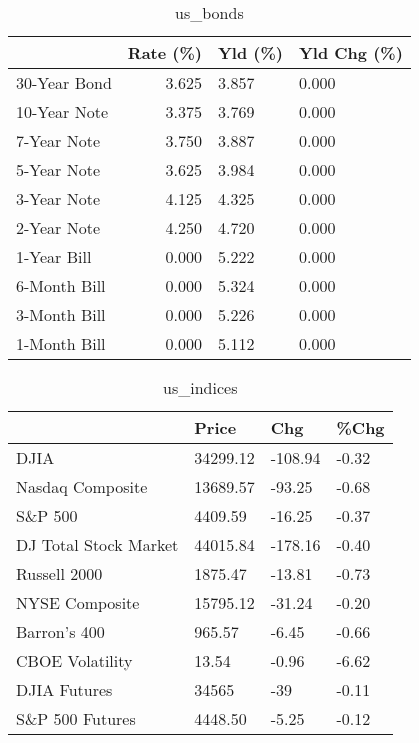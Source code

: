 \documentclass{article}%
\begin{document}
%


\begin{table}[htbp]%
\caption{us\_bonds}%
\centering%
\begin{adjustbox}{width=1\textwidth}%
\begin{tabular}{lrll}
\toprule
             &  Rate (\%) & Yld (\%) & Yld Chg (\%) \\
\midrule
30-Year Bond &     3.625 &   3.857 &       0.000 \\
10-Year Note &     3.375 &   3.769 &       0.000 \\
 7-Year Note &     3.750 &   3.887 &       0.000 \\
 5-Year Note &     3.625 &   3.984 &       0.000 \\
 3-Year Note &     4.125 &   4.325 &       0.000 \\
 2-Year Note &     4.250 &   4.720 &       0.000 \\
 1-Year Bill &     0.000 &   5.222 &       0.000 \\
6-Month Bill &     0.000 &   5.324 &       0.000 \\
3-Month Bill &     0.000 &   5.226 &       0.000 \\
1-Month Bill &     0.000 &   5.112 &       0.000 \\
\bottomrule
\end{tabular}
%
\end{adjustbox}%
\end{table}

%


\begin{table}[htbp]%
\caption{us\_indices}%
\centering%
\begin{adjustbox}{width=1\textwidth}%
\begin{tabular}{llll}
\toprule
                      &    Price &     Chg &  \%Chg \\
\midrule
                 DJIA & 34299.12 & -108.94 & -0.32 \\
     Nasdaq Composite & 13689.57 &  -93.25 & -0.68 \\
              S\&P 500 &  4409.59 &  -16.25 & -0.37 \\
DJ Total Stock Market & 44015.84 & -178.16 & -0.40 \\
         Russell 2000 &  1875.47 &  -13.81 & -0.73 \\
       NYSE Composite & 15795.12 &  -31.24 & -0.20 \\
         Barron's 400 &   965.57 &   -6.45 & -0.66 \\
      CBOE Volatility &    13.54 &   -0.96 & -6.62 \\
         DJIA Futures &    34565 &     -39 & -0.11 \\
      S\&P 500 Futures &  4448.50 &   -5.25 & -0.12 \\
\bottomrule
\end{tabular}
%
\end{adjustbox}%
\end{table}
\end{document}
